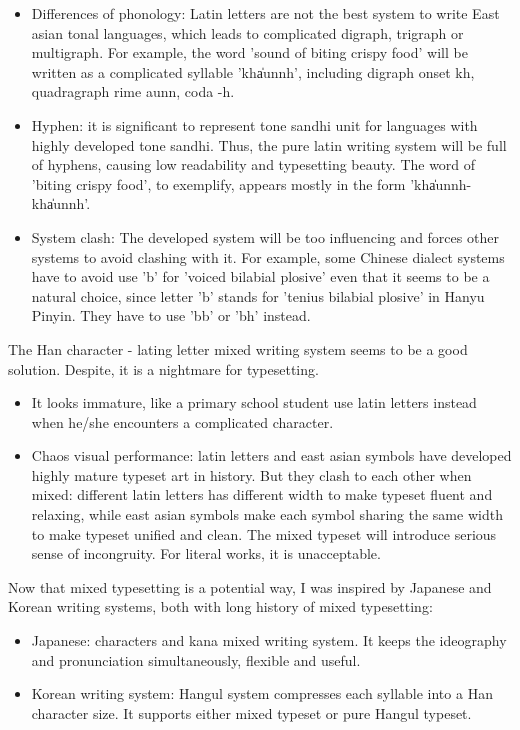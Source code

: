 \begin{itemize}
	\item Differences of phonology: Latin letters are not the best system to write East asian tonal languages, which leads to complicated digraph, trigraph or multigraph. For example, the word 'sound of biting crispy food' will be written as a complicated syllable 'kha̍unnh', including digraph onset kh, quadragraph rime aunn, coda -h. 
	\item Hyphen: it is significant to represent tone sandhi unit for languages with highly developed tone sandhi. Thus, the pure latin writing system will be full of hyphens, causing low readability and typesetting beauty. The word of 'biting crispy food', to exemplify, appears mostly in the form 'kha̍unnh-kha̍unnh'. 
	\item System clash: The developed system will be too influencing and forces other systems to avoid clashing with it. For example, some Chinese dialect systems have to avoid use 'b' for 'voiced bilabial plosive' even that it seems to be a natural choice, since letter 'b' stands for 'tenius bilabial plosive' in Hanyu Pinyin. They have to use 'bb' or 'bh' instead. 
\end{itemize}

The Han character - lating letter mixed writing system seems to be a good solution. Despite, it is a nightmare for typesetting. 
\begin{itemize}
	\item It looks immature, like a primary school student use latin letters instead when he/she encounters a complicated character. 
	\item Chaos visual performance: latin letters and east asian symbols have developed highly mature typeset art in history. But they clash to each other when mixed: different latin letters has different width to make typeset fluent and relaxing, while east asian symbols make each symbol sharing the same width to make typeset unified and clean. The mixed typeset will introduce serious sense of incongruity. For literal works, it is unacceptable. 
\end{itemize}

Now that mixed typesetting is a potential way, I was inspired by Japanese and Korean writing systems, both with long history of mixed typesetting: 
\begin{itemize}
	\item Japanese: characters and kana mixed writing system. It keeps the ideography and pronunciation simultaneously, flexible and useful. 
	\item Korean writing system: Hangul system compresses each syllable into a Han character size. It supports either mixed typeset or pure Hangul typeset. 
\end{itemize}

